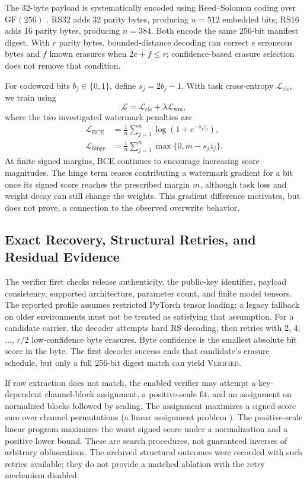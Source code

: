 \documentclass[conference]{IEEEtran}
\begin{document}
The 32-byte payload is systematically encoded using Reed--Solomon coding
over $\mathrm{GF}(256)$ \cite{reed1960polynomial}. RS32 adds 32 parity
bytes, producing $n=512$ embedded bits; RS16 adds 16 parity bytes, producing
$n=384$. Both encode the same 256-bit manifest digest. With $r$ parity
bytes, bounded-distance decoding can correct $e$ erroneous bytes and $f$
known erasures when $2e+f\le r$; confidence-based erasure selection does not
remove that condition.

For codeword bits $b_j\in\{0,1\}$, define $s_j=2b_j-1$. With task
cross-entropy $\mathcal{L}_{\mathrm{cls}}$, we train using
\begin{equation}
 \mathcal{L}=\mathcal{L}_{\mathrm{cls}}+
 \lambda\mathcal{L}_{\mathrm{wm}},
 \label{eq:total}
\end{equation}
where the two investigated watermark penalties are
\begin{align}
 \mathcal{L}_{\mathrm{BCE}}&=\frac1n\sum_{j=1}^n
 \log\!\left(1+e^{-s_jz_j}\right),\label{eq:bce}\\
 \mathcal{L}_{\mathrm{hinge}}&=\frac1n\sum_{j=1}^n
 \max\{0,m-s_jz_j\}.\label{eq:hinge}
\end{align}
At finite signed margins, BCE continues to encourage increasing score
magnitudes. The hinge term ceases contributing a watermark gradient for a bit
once its signed score reaches the prescribed margin $m$, although task loss
and weight decay can still change the weights. This gradient difference
motivates, but does not prove, a connection to the observed overwrite
behavior.

\subsection{Exact Recovery, Structural Retries, and Residual Evidence}
The verifier first checks release authenticity, the public-key identifier,
payload consistency, supported architecture, parameter count, and finite
model tensors. The reported profile assumes restricted PyTorch tensor loading;
a legacy fallback on older environments must not be treated as satisfying
that assumption. For a candidate carrier, the decoder attempts hard RS
decoding, then retries with 2, 4, $\ldots$, $r/2$ low-confidence byte
erasures. Byte confidence is the smallest absolute bit score in the byte.
The first decoder success ends that candidate's erasure schedule, but only a
full 256-bit digest match can yield \textsc{Verified}.

If raw extraction does not match, the enabled verifier may attempt a
key-dependent channel-block assignment, a positive-scale fit, and an
assignment on normalized blocks followed by scaling. The assignment
maximizes a signed-score sum over channel permutations (a linear assignment
problem \cite{kuhn1955hungarian}). The positive-scale
linear program maximizes the worst signed score under a normalization and a
positive lower bound. These are search procedures, not guaranteed inverses
of arbitrary obfuscations. The archived structural outcomes were recorded
with such retries available; they do not provide a matched ablation with the
retry mechanism disabled.
\end{document}
